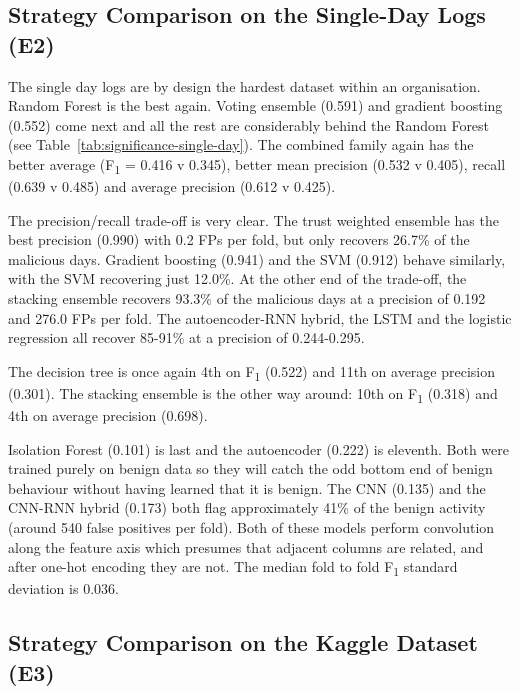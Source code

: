 \documentclass[a4paper,12pt]{article}
\newcommand{\resultinput}[1]{{\let\small\footnotesize\setlength{\tabcolsep}{4pt}}}
\begin{document}
\subsection{Strategy Comparison on the Single-Day Logs (E2)}
\label{sec:8.2}

\resultinput{tables/resultsSingleDay}

The single day logs are by design the hardest dataset within an organisation. Random Forest is the best again. Voting ensemble (0.591) and gradient boosting (0.552) come next and all the rest are considerably behind the Random Forest (see Table~\ref{tab:significance-single-day}). The combined family again has the better average (F\textsubscript{1} = 0.416 v 0.345), better mean precision (0.532 v 0.405), recall (0.639 v 0.485) and average precision (0.612 v 0.425).

The precision/recall trade-off is very clear. The trust weighted ensemble has the best precision (0.990) with 0.2 FPs per fold, but only recovers 26.7\% of the malicious days. Gradient boosting (0.941) and the SVM (0.912) behave similarly, with the SVM recovering just 12.0\%. At the other end of the trade-off, the stacking ensemble recovers 93.3\% of the malicious days at a precision of 0.192 and 276.0 FPs per fold. The autoencoder-RNN hybrid, the LSTM and the logistic regression all recover 85-91\% at a precision of 0.244-0.295.

The decision tree is once again 4th on F\textsubscript{1} (0.522) and 11th on average precision (0.301). The stacking ensemble is the other way around: 10th on F\textsubscript{1} (0.318) and 4th on average precision (0.698).

Isolation Forest (0.101) is last and the autoencoder (0.222) is eleventh. Both were trained purely on benign data so they will catch the odd bottom end of benign behaviour without having learned that it is benign. The CNN (0.135) and the CNN-RNN hybrid (0.173) both flag approximately 41\% of the benign activity (around 540 false positives per fold). Both of these models perform convolution along the feature axis which presumes that adjacent columns are related, and after one-hot encoding they are not. The median fold to fold F\textsubscript{1} standard deviation is 0.036.

\resultinput{tables/significanceSingleDay}

\subsection{Strategy Comparison on the Kaggle Dataset (E3)}
\label{sec:8.3}
\end{document}

